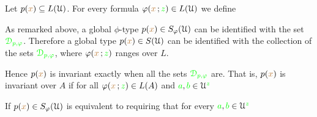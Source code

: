    

% 

Let $p({\color{brown} x})\subseteq L(\EuScript U)$.
For every formula $\varphi({\color{brown} x}\,;{\color{green} z})\in L(\EuScript U)$ we define



As remarked above, a global $\phi$-type $p({\color{brown} x})\in S_\varphi(\EuScript U)$ can be identified with the set ${\color{green}\EuScript D_{p,\varphi}}$.
Therefore a global type $p({\color{brown} x})\in S(\EuScript U)$ can be identified with the collection of the sets ${\color{green}\EuScript D_{p,\varphi}}$, where $\varphi({\color{brown} x}\,;{\color{green} z})$ ranges over $L$.

Hence $p({\color{brown} x})$ is invariant exactly when all the sets $\color{green}\EuScript D_{p,\varphi}$ are.
That is, $p({\color{brown} x})$ is invariant over $A$ if for all $\varphi({\color{brown} x}\,;{\color{green} z})\in L(A)$ and ${\color{green} a},{\color{green} b}\in\EuScript U^{\color{green} z}$



If $p({\color{brown} x})\in S_\varphi(\EuScript U)$  is equivalent to requiring that for every ${\color{green} a},{\color{green} b}\in\EuScript U^{\color{green} z}$

